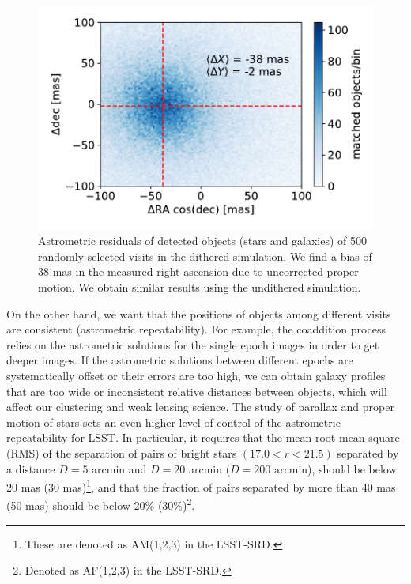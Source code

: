 \documentclass[a4paper,fleqn,usenatbib]{mnras}
\begin{document}
\begin{figure}
\centering
\includegraphics[width=0.9\columnwidth]{astrometric_residuals_single_visit_2d}
\caption{Astrometric residuals of detected objects (stars and galaxies) of 500 randomly selected visits in the dithered simulation. We find a bias of 38 mas in the measured right ascension due to uncorrected proper motion. We obtain similar results using the undithered simulation.}
\label{fig:AA1}
\end{figure}

On the other hand, we want that the positions of objects among different visits are consistent (astrometric repeatability). For example, the coaddition process relies on the astrometric solutions for the single epoch images in order to get deeper images. If the astrometric solutions between different epochs are systematically offset or their errors are too high, we can obtain galaxy profiles that are too wide or inconsistent relative distances between objects, which will affect our clustering and weak lensing science. The study of parallax and proper motion of stars sets an even higher level of control of the astrometric repeatability for LSST. In particular, it requires that the mean root mean square (RMS) of the separation of pairs of bright stars $(17.0 < r < 21.5)$ separated by a distance $D=5$ arcmin and $D=20$ arcmin ($D=200$ arcmin), should be below 20 mas (30 mas)\footnote{These are denoted as AM(1,2,3) in the LSST-SRD.}, and that the fraction of pairs separated by more than 40 mas  (50 mas) should be below $20\%$ ($30\%$)\footnote{Denoted as AF(1,2,3) in the LSST-SRD.}. 

\end{document}
